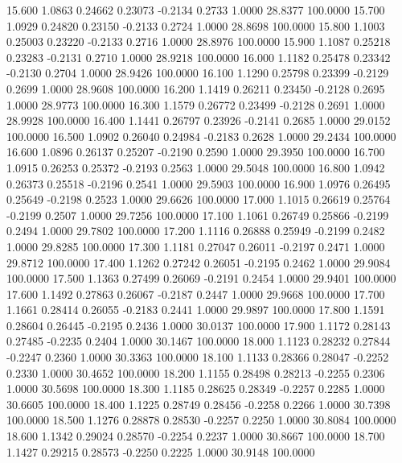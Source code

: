  15.600   1.0863   0.24662   0.23073  -0.2134   0.2733   1.0000  28.8377 100.0000
  15.700   1.0929   0.24820   0.23150  -0.2133   0.2724   1.0000  28.8698 100.0000
  15.800   1.1003   0.25003   0.23220  -0.2133   0.2716   1.0000  28.8976 100.0000
  15.900   1.1087   0.25218   0.23283  -0.2131   0.2710   1.0000  28.9218 100.0000
  16.000   1.1182   0.25478   0.23342  -0.2130   0.2704   1.0000  28.9426 100.0000
  16.100   1.1290   0.25798   0.23399  -0.2129   0.2699   1.0000  28.9608 100.0000
  16.200   1.1419   0.26211   0.23450  -0.2128   0.2695   1.0000  28.9773 100.0000
  16.300   1.1579   0.26772   0.23499  -0.2128   0.2691   1.0000  28.9928 100.0000
  16.400   1.1441   0.26797   0.23926  -0.2141   0.2685   1.0000  29.0152 100.0000
  16.500   1.0902   0.26040   0.24984  -0.2183   0.2628   1.0000  29.2434 100.0000
  16.600   1.0896   0.26137   0.25207  -0.2190   0.2590   1.0000  29.3950 100.0000
  16.700   1.0915   0.26253   0.25372  -0.2193   0.2563   1.0000  29.5048 100.0000
  16.800   1.0942   0.26373   0.25518  -0.2196   0.2541   1.0000  29.5903 100.0000
  16.900   1.0976   0.26495   0.25649  -0.2198   0.2523   1.0000  29.6626 100.0000
  17.000   1.1015   0.26619   0.25764  -0.2199   0.2507   1.0000  29.7256 100.0000
  17.100   1.1061   0.26749   0.25866  -0.2199   0.2494   1.0000  29.7802 100.0000
  17.200   1.1116   0.26888   0.25949  -0.2199   0.2482   1.0000  29.8285 100.0000
  17.300   1.1181   0.27047   0.26011  -0.2197   0.2471   1.0000  29.8712 100.0000
  17.400   1.1262   0.27242   0.26051  -0.2195   0.2462   1.0000  29.9084 100.0000
  17.500   1.1363   0.27499   0.26069  -0.2191   0.2454   1.0000  29.9401 100.0000
  17.600   1.1492   0.27863   0.26067  -0.2187   0.2447   1.0000  29.9668 100.0000
  17.700   1.1661   0.28414   0.26055  -0.2183   0.2441   1.0000  29.9897 100.0000
  17.800   1.1591   0.28604   0.26445  -0.2195   0.2436   1.0000  30.0137 100.0000
  17.900   1.1172   0.28143   0.27485  -0.2235   0.2404   1.0000  30.1467 100.0000
  18.000   1.1123   0.28232   0.27844  -0.2247   0.2360   1.0000  30.3363 100.0000
  18.100   1.1133   0.28366   0.28047  -0.2252   0.2330   1.0000  30.4652 100.0000
  18.200   1.1155   0.28498   0.28213  -0.2255   0.2306   1.0000  30.5698 100.0000
  18.300   1.1185   0.28625   0.28349  -0.2257   0.2285   1.0000  30.6605 100.0000
  18.400   1.1225   0.28749   0.28456  -0.2258   0.2266   1.0000  30.7398 100.0000
  18.500   1.1276   0.28878   0.28530  -0.2257   0.2250   1.0000  30.8084 100.0000
  18.600   1.1342   0.29024   0.28570  -0.2254   0.2237   1.0000  30.8667 100.0000
  18.700   1.1427   0.29215   0.28573  -0.2250   0.2225   1.0000  30.9148 100.0000
